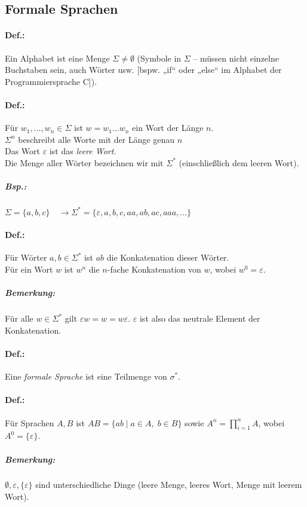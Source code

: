 \subsection{Formale Sprachen}
\paragraph{Def.:} Ein Alphabet ist eine Menge $\Sigma \not = \emptyset$ (Symbole in $\Sigma$ -- müssen nicht einzelne Buchstaben sein, auch Wörter usw. [bspw. „if“ oder „else“ im Alphabet der Programmiersprache C]).

\paragraph{Def.:} Für $w_1, ..., w_n \in \Sigma$ ist $w=w_1...w_n$ ein Wort der Länge $n$.\\
$\Sigma^n$ beschreibt alle Worte mit der Länge genau $n$\\
Das Wort $\varepsilon$ ist das \emph{leere Wort}.\\
Die Menge aller Wörter bezeichnen wir mit $\Sigma^*$ (einschließlich dem leeren Wort).

\subparagraph{Bsp.:} $\Sigma = \{a,b,c\}\quad \rightarrow \Sigma^*=\{\varepsilon, a, b, c, aa, ab,a c, aaa, ...\}$
\paragraph{Def.:} Für Wörter $a,b \in \Sigma^*$ ist $ab$ die Konkatenation dieser Wörter.\\
Für ein Wort $w$ ist $w^n$ die $n$-fache Konkatenation von $w$, wobei $w^0=\varepsilon$.

\subparagraph{Bemerkung:} Für alle $w \in \Sigma^*$ gilt $\varepsilon w = w = w \varepsilon$. $\varepsilon$ ist also das neutrale Element der Konkatenation.

\paragraph{Def.:} Eine \emph{formale Sprache} ist eine Teilmenge von $\sigma^*$.

\paragraph{Def.:} Für Sprachen $A, B$ ist $AB=\{ab \;|\; a \in A, \; b \in B\}$ sowie $A^n=\prod_{i=1}^{n}A$, wobei $A^0=\{\varepsilon\}$.
\subparagraph{Bemerkung:} $\emptyset, \varepsilon, \{\varepsilon\}$ sind unterschiedliche Dinge (leere Menge, leeres Wort, Menge mit leerem Wort).

